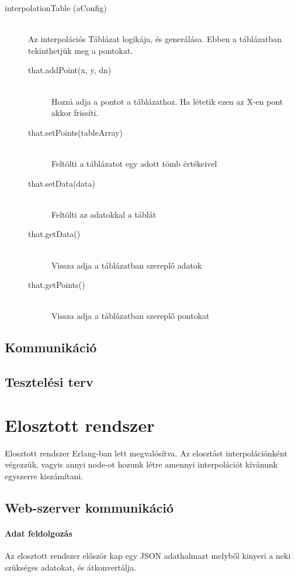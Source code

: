 \documentclass{elteikthesis}
\begin{document}
\begin{description}
		\item[interpolationTable (aConfig)]
			\hfill \\ 
				Az interpolációs Táblázat logikája, és generálása. Ebben a táblázatban tekinthetjük meg a pontokat.
			\begin{description}
			\item[that.addPoint(x, y, dn)] 
			\hfill \\ Hozzá adja a pontot a táblázathoz. Ha létetik ezen az X-en pont akkor frissíti.
			\item[that.setPoints(tableArray)] 
			\hfill \\ Feltölti a táblázatot egy adott tömb értékeivel
			\item[that.setData(data)] 
			\hfill \\ Feltölti az adatokkal a táblát
			\item[that.getData()] 
			\hfill \\ Vissza adja a táblázatban szereplő adatok
			\item[that.getPoints()] 
			\hfill \\ Vissza adja a táblázatban szereplő pontokat
			\end{description}
	\end{description}

\subsection{Kommunikáció}
\subsection{Tesztelési terv}

\section{Elosztott rendszer}
Elosztott rendszer Erlang-ban lett megvalósítva. Az elosztást interpolációnként végezzük, vagyis annyi node-ot hozunk létre amennyi interpolációt kívánunk egyszerre kiszámítani.
\subsection{Web-szerver kommunikáció}
\paragraph{Adat feldolgozás}
Az elosztott rendszer először kap egy JSON adathalmazt melyből kinyeri a neki szükséges adatokat, és átkonvertálja.
\end{document}
